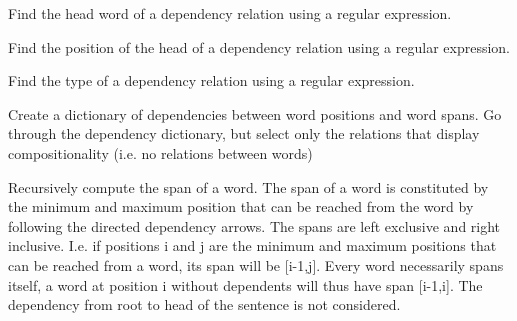 \documentclass[letterpaper,10pt,english]{sphinxmanual}
\begin{document}
\begin{fulllineitems}
\begin{fulllineitems}
\end{fulllineitems}


\begin{fulllineitems}
\label{dependencies:dependencies.Dependencies.find_head}
Find the head word of a dependency relation using a regular
expression.

\end{fulllineitems}


\begin{fulllineitems}
\label{dependencies:dependencies.Dependencies.find_head_pos}
Find the position of the head of a dependency relation
using a regular expression.

\end{fulllineitems}


\begin{fulllineitems}
\label{dependencies:dependencies.Dependencies.find_relationtype}
Find the type of a dependency relation using a
regular expression.

\end{fulllineitems}


\begin{fulllineitems}
\label{dependencies:dependencies.Dependencies.get_comp_spanrels}
Create a dictionary of dependencies between word positions
and word spans. Go through the dependency dictionary, but
select only the relations that display compositionality
(i.e. no relations between words)

\end{fulllineitems}


\begin{fulllineitems}
\label{dependencies:dependencies.Dependencies.get_span}
Recursively compute the span of a word. 
The span of a word is constituted by the minimum and
maximum position that can be reached from the word by
following the directed dependency arrows. The spans are
left exclusive and right inclusive. I.e. if positions
i and j are the minimum and maximum positions that can
be reached from a word, its span will be {[}i-1,j{]}. Every
word necessarily spans itself, a word at position i
without dependents will thus have span {[}i-1,i{]}.
The dependency from root to head of the sentence is not
considered.


\end{fulllineitems}
\end{fulllineitems}
\end{document}
